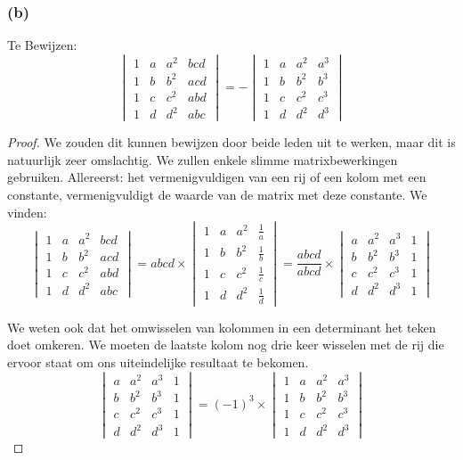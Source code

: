 \documentclass[lineaire_algebra_oplossingen.tex]{subfiles}
\begin{document}
\subsubsection*{(b)}
Te Bewijzen:
\[
\begin{vmatrix}
1 & a & a^2 & bcd\\
1 & b & b^2 & acd\\
1 & c & c^2 & abd\\
1 & d & d^2 & abc
\end{vmatrix}
=
-
\begin{vmatrix}
1 & a & a^2 & a^3\\
1 & b & b^2 & b^3\\
1 & c & c^2 & c^3\\
1 & d & d^2 & d^3
\end{vmatrix}
\]
\begin{proof}
    We zouden dit kunnen bewijzen door beide leden uit te werken, maar dit is natuurlijk zeer omslachtig. We zullen enkele slimme matrixbewerkingen gebruiken. Allereerst: het vermenigvuldigen van een rij of een kolom met een constante, vermenigvuldigt de waarde van de matrix met deze constante. We vinden:
\[
\begin{vmatrix}
1 & a & a^2 & bcd\\
1 & b & b^2 & acd\\
1 & c & c^2 & abd\\
1 & d & d^2 & abc
\end{vmatrix}
=
abcd \times
\begin{vmatrix}
    1 & a & a^2 & \frac{1}{a}\\
    1 & b & b^2 & \frac{1}{b}\\
    1 & c & c^2 & \frac{1}{c}\\
    1 & d & d^2 & \frac{1}{d}
\end{vmatrix}
=
\frac{abcd}{abcd} \times
\begin{vmatrix}
    a & a^2 & a^3 & 1 \\
    b & b^2 & b^3 & 1 \\
    c & c^2 & c^3 & 1 \\
    d & d^2 & d^3 & 1 
\end{vmatrix}
\]

We weten ook dat het omwisselen van kolommen in een determinant het teken doet omkeren. We moeten de laatste kolom nog drie keer wisselen met de rij die ervoor staat om ons uiteindelijke resultaat te bekomen.
\[
\begin{vmatrix}
    a & a^2 & a^3 & 1 \\
    b & b^2 & b^3 & 1 \\
    c & c^2 & c^3 & 1 \\
    d & d^2 & d^3 & 1 
\end{vmatrix}
=
(-1)^3 \times
\begin{vmatrix}
1 & a & a^2 & a^3\\
1 & b & b^2 & b^3\\
1 & c & c^2 & c^3\\
1 & d & d^2 & d^3
\end{vmatrix}
\]
\end{proof}
\end{document}
